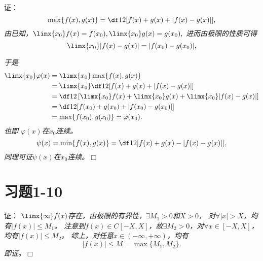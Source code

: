 \begin{frame}
	\linespread{1.5}
	\pause
	
	
	证：\it
	$$\max\{f(x),g(x)\}=\df12[f(x)+g(x)+|f(x)-g(x)|],$$
	\pause 由已知，$\limx{x_0}f(x)=f(x_0),
	\limx{x_0}g(x)=g(x_0),$
	\pause 进而由极限的性质可得
	$$\limx{x_0}|f(x)-g(x)|=|f(x_0)-g(x_0)|,$$
\end{frame}

\begin{frame}
	\linespread{1.5}
	
	
	\it\small 于是
	\begin{align*}
		\limx{x_0}\varphi(x)&=\limx{x_0}\max\{f(x),g(x)\}\\
		&=\limx{x_0}\df12[f(x)+g(x)+|f(x)-g(x)|]\\
		&=\df12\left[\limx{x_0}f(x)+\limx{x_0}g(x)+\limx{x_0}|f(x)-g(x)|\right]\\
		&=\df12[f(x_0)+g(x_0)+|f(x_0)-g(x_0)|]\\
		&=\max\{f(x_0),g(x_0)\}=\varphi(x_0).
	\end{align*}
	\pause 也即 $\varphi(x)$在$x_0$连续。
	\pause
	$$\psi(x)=\min\{f(x),g(x)\}=\df12[f(x)+g(x)-|f(x)-g(x)|],$$
	同理可证$\psi(x)$在$x_0$连续。\hfill$\Box$
\end{frame}

\section{习题1-10}

\begin{frame}
	\linespread{1.5}
	\pause
	
	
	证：\it
	$\limx{\infty}f(x)$存在，由极限的有界性，$\exists M_1>0$和$X>0$，
	对$\forall |x|>X$，均有$|f(x)|\leq M_1$。
	\pause
	注意到$f(x)\in C[-X,X]$，故$\exists M_2>0$，对$\forall x\in[-X,X]$，
	均有$|f(x)|\leq M_2$。
	\pause
	综上，对任意$x\in(-\infty,+\infty)$，均有
	$$|f(x)|\leq M=\max\{M_1,M_2\}.$$
	即证。\hfill$\Box$
\end{frame}

